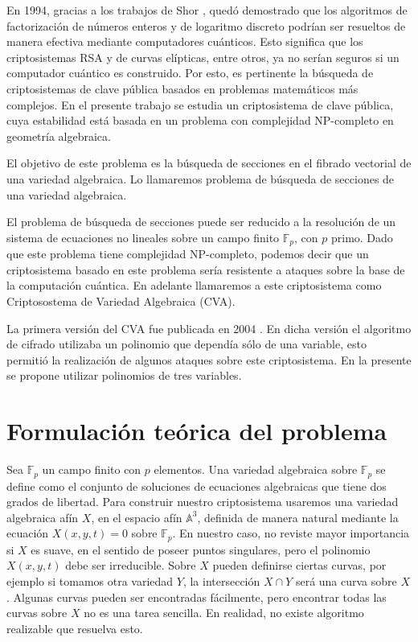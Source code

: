 \documentclass[12pt]{article}
\begin{document}
En 1994, gracias a los trabajos de Shor \cite{shor}, qued\'o demostrado que los algoritmos de factorizaci\'on de n\'umeros enteros y de logaritmo discreto podr\'ian ser resueltos de manera efectiva mediante computadores cu\'anticos. Esto significa que los  criptosistemas RSA y de curvas el\'ipticas, entre otros, ya no ser\'ian seguros si un computador cu\'antico es construido. Por esto, es pertinente la b\'usqueda de criptosistemas de clave p\'ublica basados en problemas matem\'aticos m\'as complejos. En el presente trabajo  se estudia un criptosistema de clave p\'ublica, cuya estabilidad est\'a basada en un problema con complejidad NP-completo en geometr\'ia algebraica.


El objetivo de este problema es la b\'usqueda de secciones en el fibrado vectorial de una variedad  algebraica. Lo llamaremos problema de b\'usqueda  de secciones de una variedad  algebraica.


El problema de b\'usqueda de secciones puede ser reducido a la resoluci\'on de un sistema de ecuaciones no lineales sobre un campo finito $\mathbb{F}_p$, con $p$ primo. Dado que este problema tiene complejidad NP-completo, podemos decir que un criptosistema basado en este problema ser\'ia resistente a ataques sobre la base de la computaci\'on cu\'antica. En adelante llamaremos a este criptosistema como Criptosostema de Variedad Algebraica (CVA).


La primera versi\'on del CVA fue publicada en 2004 \cite{akiyama}. En dicha versi\'on el algoritmo de cifrado utilizaba un polinomio que dependía s\'olo de una variable, esto permiti\'o la realizaci\'on de algunos ataques sobre este criptosistema. En la presente se propone utilizar polinomios de tres variables.


\section*{Formulaci\'on te\'orica del problema}
\noindent

 Sea $\mathbb{F}_p$ un campo finito con $p$ elementos. Una variedad algebraica sobre $\mathbb{F}_p$ se define como el conjunto de soluciones de ecuaciones algebraicas que tiene dos grados de libertad. Para construir nuestro criptosistema usaremos una variedad algebraica af\'in $X$, en el espacio af\'in  $\mathbb{A}^3$, definida  de manera natural mediante la ecuación $X (x, y, t) = 0$ sobre $\mathbb{F}_p$. En nuestro caso, no reviste mayor importancia si $X$ es suave, en el sentido de poseer puntos singulares, pero el polinomio $X (x, y, t)$ debe ser irreducible. Sobre $X$ pueden definirse ciertas curvas, por ejemplo si tomamos otra variedad $Y$,  la intersecci\'on $X \cap Y$ ser\'a una curva sobre $X$. Algunas curvas pueden ser encontradas f\'acilmente, pero encontrar todas las curvas sobre $X$ no es una tarea sencilla. En realidad, no existe algoritmo realizable que resuelva esto. 
\end{document}
